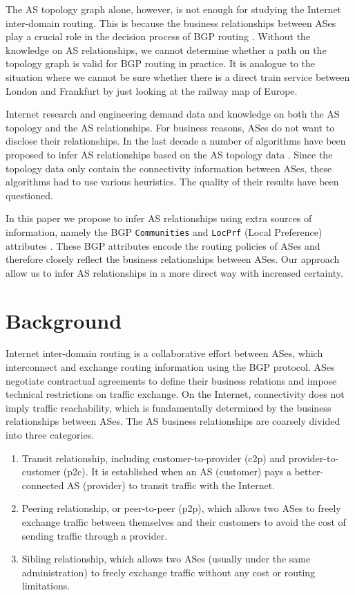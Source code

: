 \documentclass[conference]{IEEEtran}
\begin{document}
The AS topology graph alone, however, is not enough for studying the Internet inter-domain routing. This is because the business relationships between ASes play a crucial role in the decision process of BGP routing  \cite{rfc4271,Tangmunarunkit:2001}. Without the  knowledge on AS relationships, we cannot determine whether a path on the  topology graph is  valid for BGP routing in practice. It is analogue to the situation where we cannot be sure whether there is a direct train service between London and Frankfurt by just looking at the railway map of Europe. 

Internet research and engineering demand data and knowledge on both the AS topology and the AS relationships. For business reasons, ASes do not want to disclose their relationships. 
In the last decade a number of algorithms have been proposed to infer AS relationships based on the AS topology data \cite{gao1, Subramanian1,Dimitropoulos2,Oliveira2}. Since the topology data only contain the connectivity information between ASes, these algorithms had to use various heuristics. The quality of their results have been questioned.


In this paper we propose  to infer  AS relationships using extra sources of information, namely the BGP {\tt Communities} and {\tt LocPrf} (Local Preference)  attributes \cite{Donnet2}. These BGP attributes encode  the routing policies of ASes and therefore closely  reflect the business relationships between ASes.  Our approach allow us to infer AS relationships in a more direct way with increased certainty.
 

\section{Background}




Internet inter-domain routing is a collaborative effort between ASes, which interconnect and exchange routing information using the BGP protocol. ASes negotiate contractual agreements to define their business relations and impose technical restrictions on traffic exchange. On the Internet, connectivity does not imply traffic reachability, which is fundamentally determined by the business relationships between ASes. 
The AS business relationships are coarsely divided into three categories.
\begin{enumerate}
	\item Transit relationship, including customer-to-provider (c2p) and provider-to-customer (p2c). It is established when an AS (customer) pays a better-connected AS (provider) to transit traffic with the Internet.
	\item Peering relationship, or peer-to-peer (p2p), which allows two ASes to freely exchange traffic between themselves and their customers to avoid the cost of sending traffic through a provider.
	\item Sibling relationship, which allows two ASes (usually under the same administration) to freely exchange traffic without any cost or routing limitations.
\end{enumerate}
\end{document}
